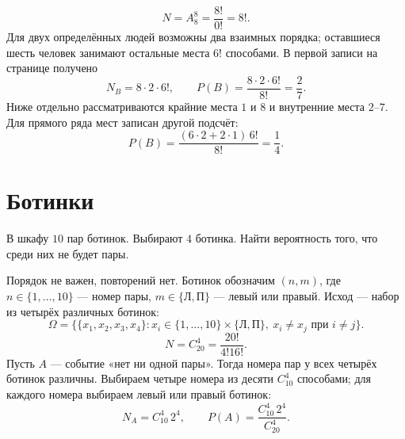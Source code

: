 \[
 N=A_8^8=\frac{8!}{0!}=8!.
\]
Для двух определённых людей возможны два взаимных порядка; оставшиеся
шесть человек занимают остальные места $6!$ способами.
В первой записи на странице получено
\[
 N_B=8\cdot2\cdot6!,\qquad P(B)=\frac{8\cdot2\cdot6!}{8!}=\frac27.
\]
Ниже отдельно рассматриваются крайние места $1$ и $8$ и внутренние места $2$--$7$.
Для прямого ряда мест записан другой подсчёт:
\[
 P(B)=\frac{(6\cdot2+2\cdot1)\,6!}{8!}=\frac14.
\]

\section*{Ботинки}
В шкафу $10$ пар ботинок. Выбирают $4$ ботинка. Найти вероятность того,
что среди них не будет пары.

Порядок не важен, повторений нет. Ботинок обозначим $(n,m)$,
где $n\in\{1,\ldots,10\}$ --- номер пары,
$m\in\{\text{Л},\text{П}\}$ --- левый или правый.
Исход --- набор из четырёх различных ботинок:
\[
 \Omega=\{\{x_1,x_2,x_3,x_4\}:x_i\in
 \{1,\ldots,10\}\times\{\text{Л},\text{П}\},\
 x_i\ne x_j\text{ при }i\ne j\}.
\]
\[
 N=C_{20}^4=\frac{20!}{4!16!}.
\]
Пусть $A$ --- событие «нет ни одной пары». Тогда номера пар у всех четырёх
ботинок различны. Выбираем четыре номера из десяти $C_{10}^4$ способами;
для каждого номера выбираем левый или правый ботинок:
\[
 N_A=C_{10}^4\,2^4,\qquad
 P(A)=\frac{C_{10}^4\,2^4}{C_{20}^4}.
\]

